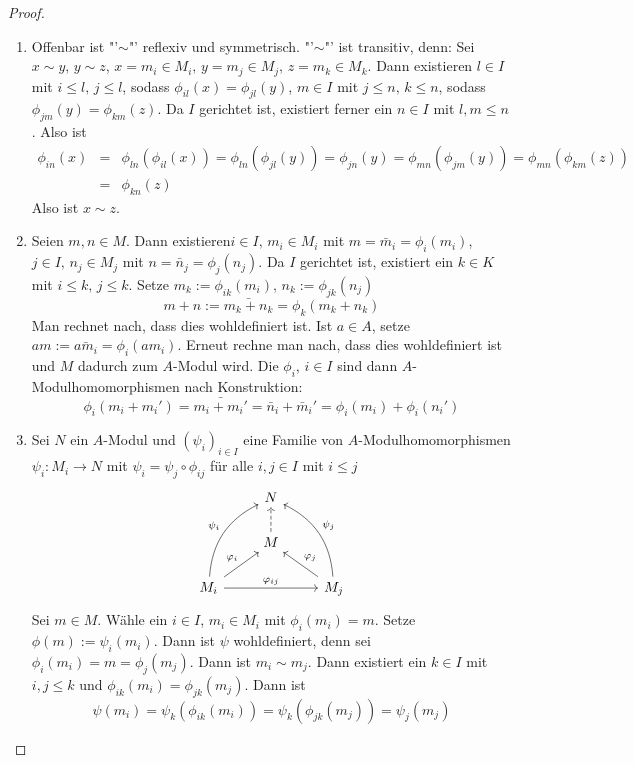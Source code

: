 \begin{proof}
	\begin{enumerate}[label= \alph*)]
		\item Offenbar ist "'$\sim$"' reflexiv und symmetrisch. "'$\sim$"' ist transitiv, denn: Sei $x\sim y, \, y\sim z$, $x= m_i \in M_i, \, y= m_j \in M_j, \, z=m_k \in M_k$. Dann existieren $l\in I$ mit $i\leq l, \, j \leq l$, sodass $\phi_{il}(x) = \phi_{jl}(y)$, $m\in I$ mit $j\leq n, \, k \leq n$, sodass $\phi_{jm}(y) = \phi_{km}(z)$. Da $I$ gerichtet ist, existiert ferner ein $n\in I$ mit $l,m\leq n$. Also ist 
		\begin{eqnarray*}
		\phi_{in}(x) &=& \phi_{ln}(\phi_{il}(x)) = \phi_{ln}(\phi_{jl}(y)) = \phi_{jn}(y) = \phi_{mn}(\phi_{jm}(y)) = \phi_{mn}(\phi_{km}(z)) \\
		&=& \phi_{kn}(z)
		\end{eqnarray*}
	Also ist $x\sim z$.
	\item Seien $m,n\in M$. Dann existieren$i\in I, \, m_i \in M_i$ mit $m=\bar m_i = \phi_i(m_i)$, $j\in I, \, n_j \in M_j$ mit $n= \bar n_j = \phi_j(n_j)$. Da $I$ gerichtet ist, existiert ein $k\in K$ mit $i\leq k, \, j\leq k$. Setze $m_k:= \phi_{ik}(m_i), \, n_k:= \phi_{jk}(n_j)$
	$$m+n:= \bar{m_k + n_k} = \phi_k(m_k + n_k)$$
	Man rechnet nach, dass dies wohldefiniert ist. Ist $a\in A$, setze $am:= \bar{a m_i}= \phi_i(a m_i)$. Erneut rechne man nach, dass dies wohldefiniert ist und $M$ dadurch zum $A$-Modul wird. Die $\phi_i$, $i\in I$ sind dann $A$-Modulhomomorphismen nach Konstruktion:
	$$\phi_i(m_i + m_i ') = \bar{m_i + m_i'} = \bar n_i + \bar m_i' = \phi_i(m_i) + \phi_i(n_i')$$
	\item Sei $N$ ein $A$-Modul und $(\psi_i)_{i\in I}$ eine Familie von $A$-Modulhomomorphismen $\psi_i:M_i \to N$ mit $\psi_i = \psi_j \circ \phi_{ij}$ für alle $i,j\in I$ mit $i\leq j$
		$$\begin{tikzcd}
	& N & \\
	& M \arrow[dashed]{u}& \\
	M_i \arrow{ur}{\phi_i} \arrow[bend left]{uur}{\psi_i} \arrow{rr}{\phi_{ij}} & & M_j \arrow[swap]{ul}{\phi_j} \arrow[bend right, swap]{uul}{\psi_j}
	\end{tikzcd}$$
	Sei $m\in M$. Wähle ein $i\in I$, $m_i \in M_i$ mit $\phi_i(m_i) = m$. Setze $\phi(m) := \psi_i(m_i)$. Dann ist $\psi$ wohldefiniert, denn sei $\phi_i(m_i) = m = \phi_j(m_j)$. Dann ist $m_i \sim m_j$. Dann existiert ein $k\in I$ mit $i,j\leq k$ und $\phi_{ik}(m_i) = \phi_{jk}(m_j)$. Dann ist
	$$\psi(m_i) = \psi_k(\phi_{ik}(m_i)) = \psi_k(\phi_{jk}(m_j)) = \psi_j(m_j)$$

\end{enumerate}
\end{proof}
